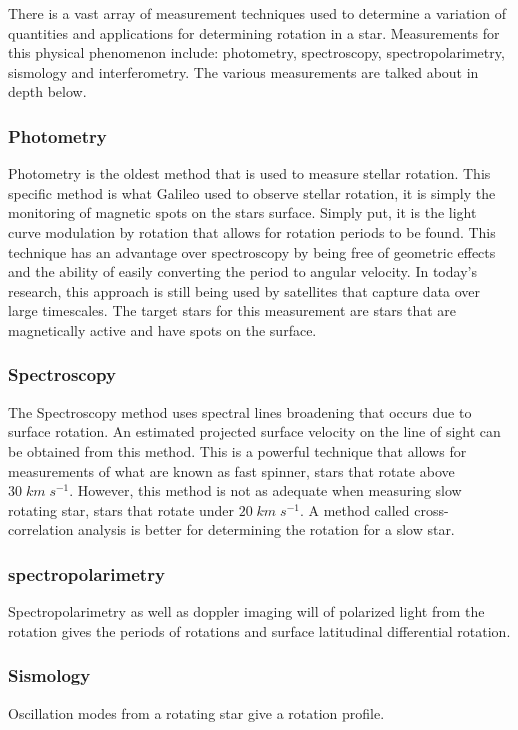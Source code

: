 \documentclass[a4paper, 12pt]{article}
\begin{document}
There is a vast array of measurement techniques used to determine a variation of quantities and applications for determining rotation in a star. Measurements for this physical phenomenon include: photometry, spectroscopy, spectropolarimetry, sismology and interferometry. The various measurements are talked about in depth below.

\subsubsection{Photometry}

Photometry is the oldest method that is used to measure stellar rotation. This specific method is what Galileo used to observe stellar rotation, it is simply the monitoring of magnetic spots on the stars surface. Simply put, it is the light curve modulation by rotation that allows for rotation periods to be found. This technique has an advantage over spectroscopy by being free of geometric effects and the ability of easily converting the period to angular velocity. In today's research, this approach is still being used by satellites that capture data over large timescales. The target stars for this measurement are stars that are magnetically active and have spots on the surface. 

\subsubsection{Spectroscopy}

The Spectroscopy method uses spectral lines broadening that occurs due to surface rotation. An estimated projected surface velocity on the line of sight can be obtained from this method. This is a powerful technique that allows for measurements of what are known as fast spinner, stars that rotate above $30 \; km \; s^{-1}$. However, this method is not as adequate when measuring slow rotating star, stars that rotate under $20 \; km \; s^{-1}$. A method called cross-correlation analysis is better for determining the rotation for a slow star. 

\subsubsection{spectropolarimetry}
Spectropolarimetry as well as doppler imaging will of polarized light from the rotation gives the periods of rotations and surface latitudinal differential rotation.

\subsubsection{Sismology}
Oscillation modes from a rotating star give a rotation profile. 
\end{document}
